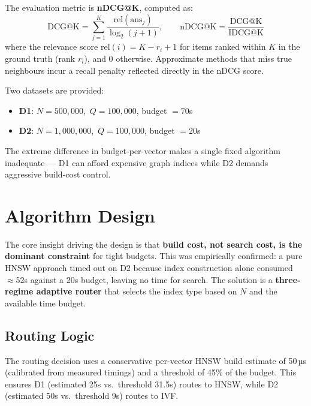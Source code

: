 \documentclass[11pt,a4paper]{article}
\begin{document}
The evaluation metric is \textbf{nDCG@K}, computed as:
\[
  \text{DCG@K} = \sum_{j=1}^{K} \frac{\mathrm{rel}(\mathrm{ans}_j)}{\log_2(j+1)},
  \qquad
  \text{nDCG@K} = \frac{\text{DCG@K}}{\text{IDCG@K}}
\]
where the relevance score $\mathrm{rel}(i) = K - r_i + 1$ for items ranked
within $K$ in the ground truth (rank $r_i$), and 0 otherwise. Approximate
methods that miss true neighbours incur a recall penalty reflected directly in
the nDCG score.

Two datasets are provided:
\begin{itemize}[leftmargin=1.5em]
  \item \textbf{D1}: $N = 500{,}000$,\ $Q = 100{,}000$, budget $= 70$s
  \item \textbf{D2}: $N = 1{,}000{,}000$,\ $Q = 100{,}000$, budget $= 20$s
\end{itemize}

The extreme difference in budget-per-vector makes a single fixed algorithm
inadequate — D1 can afford expensive graph indices while D2 demands aggressive
build-cost control.

\section{Algorithm Design}

The core insight driving the design is that \textbf{build cost, not search
cost, is the dominant constraint} for tight budgets. This was empirically
confirmed: a pure HNSW approach timed out on D2 because index construction
alone consumed $\approx$52s against a 20s budget, leaving no time for search.
The solution is a \textbf{three-regime adaptive router} that selects the index
type based on $N$ and the available time budget.

\subsection{Routing Logic}

The routing decision uses a conservative per-vector HNSW build estimate of
50\,µs (calibrated from measured timings) and a threshold of 45\% of the
budget. This ensures D1 (estimated 25s vs.\ threshold 31.5s) routes to HNSW,
while D2 (estimated 50s vs.\ threshold 9s) routes to IVF.
\end{document}
